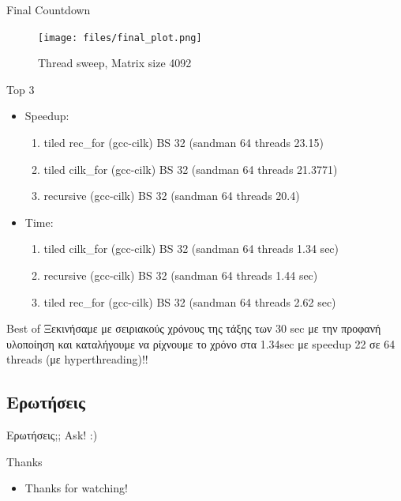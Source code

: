 \documentclass{beamer}
\begin{document}
\begin{frame}
    \begin{block}{Final Countdown}
        \begin{figure}[H]
            \centering
            \texttt{[image: files/final\_plot.png]}
            \caption{Thread sweep, Matrix size 4092}
        \end{figure}
    \end{block}
\end{frame}

\begin{frame}
    \begin{block}{Top 3}
    \begin{itemize}
        \item<1-> Speedup:
            \begin{enumerate}
                \item<2-> tiled rec\_for (gcc-cilk) BS 32 (sandman 64 threads 23.15)
                \item<3-> tiled cilk\_for (gcc-cilk) BS 32 (sandman 64 threads 21.3771)
                \item<4-> recursive (gcc-cilk) BS 32 (sandman 64 threads 20.4)
            \end{enumerate}
        \item<5-> Time:
            \begin{enumerate}
                \item<6-> tiled cilk\_for (gcc-cilk) BS 32 (sandman 64 threads 1.34 sec)
                \item<7-> recursive (gcc-cilk) BS 32 (sandman 64 threads 1.44 sec)
                \item<8-> tiled rec\_for (gcc-cilk) BS 32 (sandman 64 threads 2.62 sec)
            \end{enumerate}
    \end{itemize}
    \end{block}
\end{frame}

\begin{frame}
    \begin{block}{Best of}
        Ξεκινήσαμε με σειριακούς χρόνους της τάξης των 30 sec με την προφανή
        υλοποίηση και καταλήγουμε να ρίχνουμε το χρόνο στα 1.34sec με speedup
        22 σε 64 threads (με hyperthreading)!! \smiley{}
    \end{block}
\end{frame}


\subsection{Ερωτήσεις}
\begin{frame}{Ερωτήσεις;;}
    Ask! :)
\end{frame}

\begin{frame}{Thanks}
    \begin{itemize}
        \item Thanks for watching!
    \end{itemize}
\end{frame}
\end{document}
